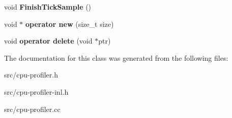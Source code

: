 \begin{DoxyCompactItemize}
\item 
\hypertarget{classv8_1_1internal_1_1_profiler_events_processor_a142c38fa289330b932097ac0705bf6ac}{}void {\bfseries Finish\+Tick\+Sample} ()\label{classv8_1_1internal_1_1_profiler_events_processor_a142c38fa289330b932097ac0705bf6ac}

\item 
\hypertarget{classv8_1_1internal_1_1_profiler_events_processor_ac90fe204c70433ce94e4125125b78b47}{}void $\ast$ {\bfseries operator new} (size\+\_\+t size)\label{classv8_1_1internal_1_1_profiler_events_processor_ac90fe204c70433ce94e4125125b78b47}

\item 
\hypertarget{classv8_1_1internal_1_1_profiler_events_processor_a9595db1768685aaba247596a6ea5e8f7}{}void {\bfseries operator delete} (void $\ast$ptr)\label{classv8_1_1internal_1_1_profiler_events_processor_a9595db1768685aaba247596a6ea5e8f7}

\end{DoxyCompactItemize}


The documentation for this class was generated from the following files\+:\begin{DoxyCompactItemize}
\item 
src/cpu-\/profiler.\+h\item 
src/cpu-\/profiler-\/inl.\+h\item 
src/cpu-\/profiler.\+cc\end{DoxyCompactItemize}
